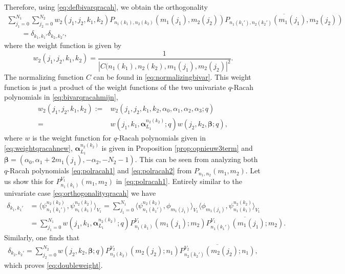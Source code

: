 \documentclass[10pt,a4paper]{amsart}
\numberwithin{equation}{section}
\begin{document}
\begin{Remark}
\begin{gather*}
	\end{gather*}
	Therefore, using \eqref{eq:defbivarqracah}, we obtain the orthogonality
	\begin{gather*}
		\sum_{j_1=0}^{N_1}\sum_{j_2=0}^{N_2} w_2(j_1,j_2,k_1,k_2) P_{n_1(k_1),n_2(k_2)}(m_1(j_1),m_2(j_2))\overline{P_{n_1(k_1'),n_2(k_2')}(m_1(j_1),m_2(j_2))} \\
		\qquad{} =\delta_{k_1,k_1'}\delta_{k_2,k_2'} ,
	\end{gather*}
	where the weight function is given by
	\[
	w_2(j_1,j_2,k_1,k_2)=\frac{1}{|C(n_1(k_1),n_2(k_2),m_1(j_1),m_2(j_2)|^2}.
	\]
	The normalizing function $C$ can be found in \eqref{eq:normalizingbivar}. This weight function is just a product of the weight functions of the two univariate $q$-Racah polynomials in \eqref{eq:bivarqracahmijn},
	\begin{align}
		w_2(j_1,j_2,k_1,k_2):={}& w_2(j_1,j_2,k_1,k_2,\alpha_0,\alpha_1,\alpha_2,\alpha_3;q)\nonumber\\
={}& w(j_1,k_1,\bm{\alpha}_{L_1}^{n_2(k_2)};q)w(j_2,k_2,\bm{\beta};q),\label{eq:doubleweight}
	\end{align}	
	where $w$ is the weight function for $q$-Racah polynomials given in \eqref{eq:weightqracahnew}, $\bm{\alpha}_{L_1}^{n_2(k_2)}$ is given in Proposition \ref{prop:opnieuw3term} and $\bm{\beta}=(\alpha_0,\alpha_1+2m_1(j_1),-\alpha_2,-N_2-1)$. This can be seen from analyzing both $q$-Racah polynomials \eqref{eq:polracah1} and \eqref{eq:polracah2} from $P_{n_1,n_2}(m_1,m_2)$. Let us show this for $P_{n_1(k_1)}^{V_1}(m_1,m_2)$ in \eqref{eq:polracah1}. Entirely similar to the univariate case \eqref{eq:orthogonalityqracah} we have
	\begin{align*}
		\delta_{k_1,k_1'}&=\big\langle \psi_{n_1(k_1')}^{n_2(k_2)},\psi_{n_1(k_1)}^{n_2(k_2)}\big\rangle _{V_1}=\sum_{j_1=0}^{N_1} \big\langle \psi_{n_1(k_1')}^{n_2(k_2)},\phi_{m_1(j_1)}\big\rangle _{V_1}\big\langle \phi_{m_1(j_1)},\psi_{n_1(k_1)}^{n_2(k_2)}\big\rangle _{V_1} \\
		&= \sum_{j_1=0}^{N_1} w(j_1,k_1,\bm{\alpha}_{L_1}^{n_2(k_2)};q)P_{n_1(k_1)}^{V_1}(m_1(j_1);m_2)\overline{P_{n_1(k_1')}^{V_1}(m_1(j_1);m_2)}.%
	\end{align*}
	Similarly, one finds that
	\begin{gather*}
		\delta_{k_2,k_2'}=\sum_{j_2=0}^{N_2} w(j_2,k_2,\bm{\beta};q)P_{n_2(k_2)}^{V_2}(m_2(j_2);n_1)\overline{P_{n_2(k_2')}^{V_2}(m_2(j_2);n_1)},%
	\end{gather*}
	which proves \eqref{eq:doubleweight}.
\end{Remark}
\end{document}

